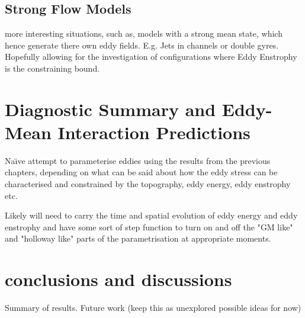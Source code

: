 \documentclass[10pt,a4paper]{article}
\begin{document}
\subsection{Strong Flow Models}

more interesting situations, such as, models
with a strong mean state, which hence
generate there own eddy fields. E.g. Jets in
channels or double gyres. Hopefully allowing 
for the investigation of configurations where 
Eddy Enstrophy is the constraining bound.


\section{Diagnostic Summary and Eddy-Mean Interaction Predictions}

Na\"{\i}ve attempt to parameterise eddies using the 
results from the previous chapters, depending
on what can be said about how the eddy stress can
be characterised and constrained by the topography,
eddy energy, eddy enstrophy etc. 

Likely will need to carry the time and spatial
evolution of eddy energy and eddy enstrophy and have
some sort of step function to turn on and off the
"GM like" and "holloway like" parts of the parametrisation at appropriate moments.


\section{conclusions and discussions}

Summary of results.
Future work (keep this as unexplored possible ideas for now)
\end{document}
